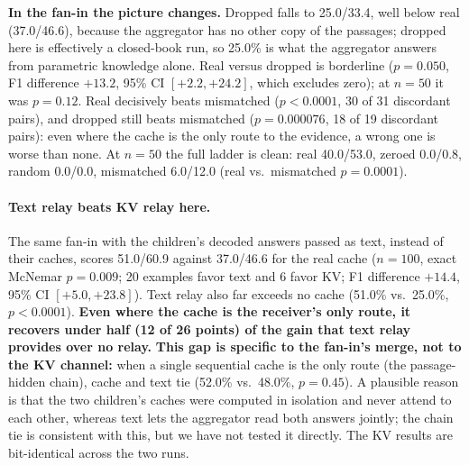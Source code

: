 \documentclass[11pt]{article}
\begin{document}
\textbf{In the fan-in the picture changes.} Dropped falls to 25.0/33.4, well below
real (37.0/46.6), because the aggregator has no other copy of the passages;
dropped here is effectively a closed-book run, so 25.0\% is what the aggregator
answers from parametric knowledge alone. Real versus dropped is borderline ($p=0.050$, F1 difference
$+13.2$, 95\% CI $[+2.2,+24.2]$, which excludes zero); at $n{=}50$ it was
$p=0.12$. Real decisively beats mismatched ($p<0.0001$, 30 of 31
discordant pairs), and dropped still beats mismatched ($p=0.000076$, 18
of 19 discordant pairs): even where the cache is the only route to the
evidence, a wrong one is worse than none. At $n{=}50$ the full ladder is
clean: real 40.0/53.0, zeroed 0.0/0.8, random 0.0/0.0, mismatched
6.0/12.0 (real vs.\ mismatched $p=0.0001$).

\paragraph{Text relay beats KV relay here.} The same fan-in with the children's
decoded answers passed as text, instead of their caches, scores 51.0/60.9 against
37.0/46.6 for the real cache ($n{=}100$, exact McNemar $p=0.009$; 20 examples
favor text and 6 favor KV; F1 difference $+14.4$, 95\% CI $[+5.0,+23.8]$). Text
relay also far exceeds no cache (51.0\% vs.\ 25.0\%, $p<0.0001$). \textbf{Even where
the cache is the receiver's only route, it recovers under half (12 of 26 points) of
the gain that text relay provides over no relay.} \textbf{This gap is specific to
the fan-in's merge, not to the KV channel:} when a single sequential cache is the
only route (the passage-hidden chain), cache and text tie (52.0\% vs.\ 48.0\%,
$p=0.45$). A plausible reason is that the two children's caches were computed in
isolation and never attend to each other, whereas text lets the aggregator read both
answers jointly; the chain tie is consistent with this, but we have not tested it
directly. The KV results are bit-identical across the two runs.
\end{document}
